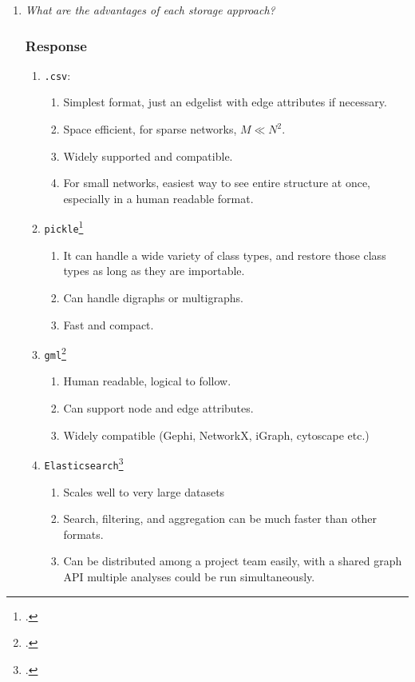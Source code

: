 \documentclass{article}
\newcommand{\response}{\subsubsection*{Response}}
\begin{document}
\begin{enumerate}
    \item \textit{What are the advantages of each storage approach?}
    \response
    \begin{enumerate}
        \item[] \texttt{.csv}:
        \begin{enumerate}
            \item Simplest format, just an edgelist with edge attributes if necessary. 
            \item Space efficient, for sparse networks, $M\ll N^2$.
            \item Widely supported and compatible. 
            \item For small networks, easiest way to see entire structure at once, especially in a human readable format. 
        \end{enumerate}
        \item[] \texttt{pickle}\footcite{python-pickle,alden-pickles}
        \begin{enumerate}
            \item It can handle a wide variety of class types, and restore those class types as long as they are importable. 
            \item Can handle digraphs or multigraphs.
            \item Fast and compact. 
        \end{enumerate}
        \item[] \texttt{gml}\footcite{yworks-gml,gephi-gml,passau-gml}
        \begin{enumerate}
            \item Human readable, logical to follow.
            \item Can support node and edge attributes.
            \item Widely compatible (Gephi, NetworkX, iGraph, cytoscape etc.)
        \end{enumerate}
        \item[] \texttt{Elasticsearch}\footcite{elastic-graph}
        \begin{enumerate}
            \item Scales well to very large datasets
            \item Search, filtering, and aggregation can be much faster than other formats. 
            \item Can be distributed among a project team easily, with a shared graph API multiple analyses could be run simultaneously. 

\end{enumerate}
\end{enumerate}
\end{enumerate}
\end{document}
